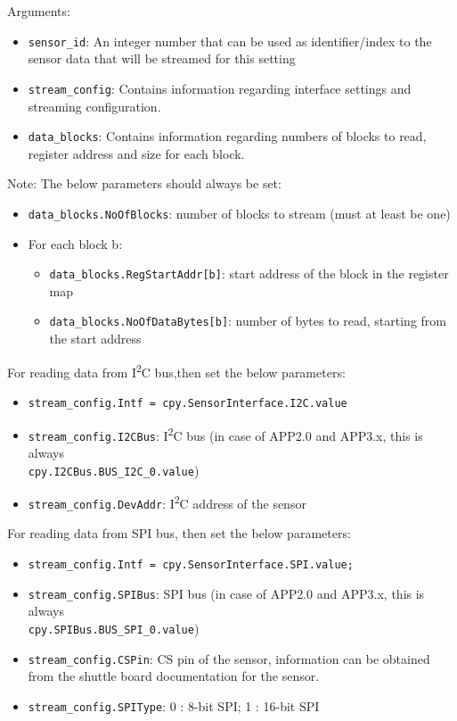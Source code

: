 Arguments:
\begin{itemize}
	\item \texttt{sensor\_id}: An integer number that can be used as identifier/index to the sensor data that will be streamed for this setting

	\item \texttt{stream\_config}: Contains information regarding interface settings and streaming configuration.
	\item  \texttt{data\_blocks}: Contains information regarding numbers of blocks to read, register address and size for each block.
\end{itemize}
Note:\newline
The below parameters should always be set:
\begin{itemize}
	\item \texttt{data\_blocks.NoOfBlocks}: number of blocks to stream (must at least be one)
	\item For each block b:
	      \begin{itemize}
		      \item \texttt{data\_blocks.RegStartAddr[b]}: start address of the block in the register map
		      \item \texttt{data\_blocks.NoOfDataBytes[b]}: number of bytes to read, starting from the start address
	      \end{itemize}
\end{itemize}
\vspace{12pt}
For reading data from I\textsuperscript{2}C bus,then set the below parameters:
\begin{itemize}
	\item \texttt{stream\_config.Intf = cpy.SensorInterface.I2C.value}
	\item \texttt{stream\_config.I2CBus}: I\textsuperscript{2}C bus (in case of APP2.0 and APP3.x, this is always\\
	      \texttt{cpy.I2CBus.BUS\_I2C\_0.value})
	\item \texttt{stream\_config.DevAddr}: I\textsuperscript{2}C address of the sensor
\end{itemize}
\vspace{12pt}
For reading data from SPI bus, then set the below parameters:
\begin{itemize}
	\item \texttt{stream\_config.Intf = cpy.SensorInterface.SPI.value;}
	\item \texttt{stream\_config.SPIBus}: SPI bus (in case of APP2.0 and APP3.x, this is always\\
	      \texttt{cpy.SPIBus.BUS\_SPI\_0.value})
	\item \texttt{stream\_config.CSPin}: CS pin of the sensor, information can be obtained from the shuttle board documentation for the sensor.
	\item \texttt{stream\_config.SPIType}: 0 : 8-bit SPI; 1 : 16-bit SPI
\end{itemize}
